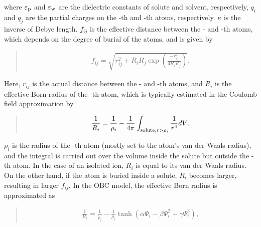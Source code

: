 \documentclass[a4paper,11pt,oneside,english]{sphinxmanual}
\begin{document}
where \(\varepsilon_{{\rm{p}}}\) and \(\varepsilon_{{\rm{w}}}\) are the dielectric constants of
solute and solvent, respectively, \(q_i\) and \(q_j\) are the partial charges
on the -th and -th atoms, respectively. \(\kappa\) is the inverse of Debye length.
\(f_{ij}\) is the effective distance between the - and -th atoms,
which depends on the degree of burial of the atoms, and is given by
\begin{quote}

\vspace{-5mm}
\begin{equation*}
\begin{split}{f_{ij}} = \sqrt {r_{ij}^2 + {R_i}{R_j}\exp \left( {\frac{{ - r_{ij}^2}}{{4{R_i}{R_j}}}} \right)}.\end{split}
\end{equation*}
\vspace{-3mm}
\end{quote}

Here, \(r_{ij}\) is the actual distance between the - and -th atoms,
and \(R_i\) is the effective Born radius of the -th atom,
which is typically estimated in the Coulomb field approximation by
\begin{quote}

\vspace{-5mm}
\begin{equation*}
\begin{split}{\frac{1}{R_i}} = {\frac{1}{{{\rho _i}}} - \frac{1}{{4\pi }}\int_{{\rm{solute}},{\rm{ }}r > {\rho _i}} {\frac{1}{{{r^4}}}} dV}.\end{split}
\end{equation*}
\vspace{-3mm}
\end{quote}

\(\rho_i\) is the radius of the -th atom (mostly set to the atom’s van der Waals radius),
and the integral is carried out over the volume inside the solute but outside the -th atom.
In the case of an isolated ion, \(R_i\) is equal to its van der Waals radius.
On the other hand, if the atom is buried inside a solute, \(R_i\) becomes larger,
resulting in larger \(f_{ij}\).
In the OBC model, the effective Born radius is approximated as
\begin{quote}

\vspace{-5mm}
\begin{equation*}
\begin{split}{\frac{1}{R_i}} = {\frac{1}{{\tilde \rho _i}} - \frac{1}{{{\rho _i}}}\tanh ({\alpha}{\Psi _i} - {\beta}\Psi _i^2 + {\gamma}\Psi _i^3)},\end{split}
\end{equation*}
\vspace{-3mm}
\end{quote}
\end{document}
